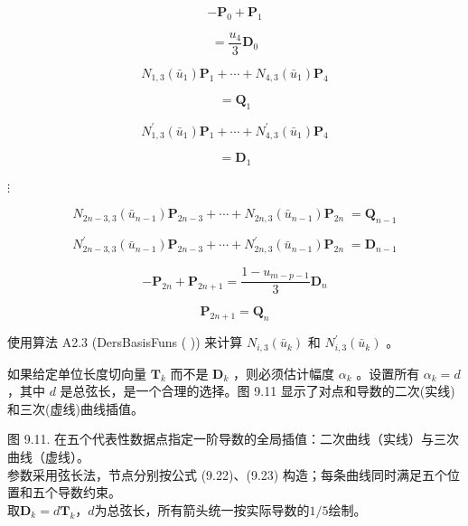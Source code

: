 \documentclass[../main.tex]{subfiles}
\begin{document}
\[
- {\mathbf{P}}_{0} + {\mathbf{P}}_{1}
\]

\[
= \frac{{u}_{4}}{3}{\mathbf{D}}_{0}
\]

\[
{N}_{1,3}\left( {\bar{u}}_{1}\right) {\mathbf{P}}_{1} + \cdots  + {N}_{4,3}\left( {\bar{u}}_{1}\right) {\mathbf{P}}_{4}
\]

\[
= {\mathbf{Q}}_{1}
\]

\[
{N}_{1,3}^{\prime }\left( {\bar{u}}_{1}\right) {\mathbf{P}}_{1} + \cdots  + {N}_{4,3}^{\prime }\left( {\bar{u}}_{1}\right) {\mathbf{P}}_{4}
\]

\[
= {\mathbf{D}}_{1}
\]

\(\vdots\)

\[
{N}_{{2n} - 3,3}\left( {\bar{u}}_{n - 1}\right) {\mathbf{P}}_{{2n} - 3} + \cdots  + {N}_{{2n},3}\left( {\bar{u}}_{n - 1}\right) {\mathbf{P}}_{2n}\; = {\mathbf{Q}}_{n - 1}
\]

\[
{N}_{{2n} - 3,3}^{\prime }\left( {\bar{u}}_{n - 1}\right) {\mathbf{P}}_{{2n} - 3} + \cdots  + {N}_{{2n},3}^{\prime }\left( {\bar{u}}_{n - 1}\right) {\mathbf{P}}_{2n}\; = {\mathbf{D}}_{n - 1}
\]

\[
- {\mathbf{P}}_{2n} + {\mathbf{P}}_{{2n} + 1} = \frac{1 - {u}_{m - p - 1}}{3}{\mathbf{D}}_{n}
\]

\[
{\mathbf{P}}_{{2n} + 1} = {\mathbf{Q}}_{n} \tag{9.24}
\]

使用算法 A2.3 (DersBasisFuns (   )) 来计算 \({N}_{i,3}\left( {\bar{u}}_{k}\right)\) 和 \({N}_{i,3}^{\prime }\left( {\bar{u}}_{k}\right)\) 。

如果给定单位长度切向量 \({\mathbf{T}}_{k}\) 而不是 \({\mathbf{D}}_{k}\) ，则必须估计幅度 \({\alpha }_{k}\) 。设置所有 \({\alpha }_{k} = d\) ，其中 \(d\) 是总弦长，是一个合理的选择。图 9.11 显示了对点和导数的二次(实线)和三次(虚线)曲线插值。

\begin{center}
\begin{minipage}{27cm}
\vspace*{.6\baselineskip}
\centering
{}
\par\smallskip
图 9.11. 在五个代表性数据点指定一阶导数的全局插值：二次曲线（实线）与三次曲线（虚线）。\\
参数采用弦长法，节点分别按公式 (9.22)、(9.23) 构造；每条曲线同时满足五个位置和五个导数约束。\\
取$\mathbf D_k=d\mathbf T_k$，$d$为总弦长，所有箭头统一按实际导数的$1/5$绘制。
\end{minipage}
\end{center}
\end{document}
